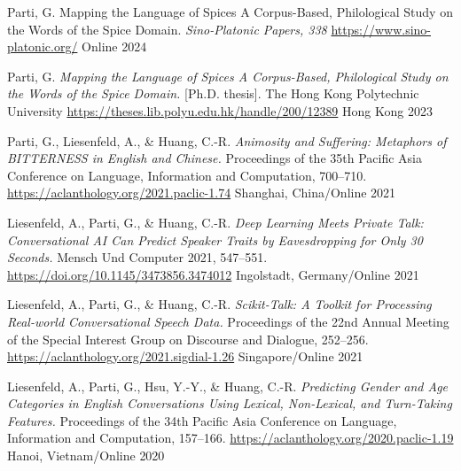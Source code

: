 
\begin{cvhonors}

  \cvhonor
  {Parti, G.} %
  {Mapping the Language of Spices A Corpus-Based, Philological Study on the Words of the Spice Domain. \textit{Sino-Platonic Papers, 338} \url{https://www.sino-platonic.org/}} %
  {Online} %
  {2024} %

  \cvhonor
  {Parti, G.} %
  {\textit{Mapping the Language of Spices A Corpus-Based, Philological Study on the Words of the Spice Domain.} [Ph.D. thesis]. The Hong Kong Polytechnic University \url{https://theses.lib.polyu.edu.hk/handle/200/12389}} %
  {Hong Kong} %
  {2023} %

  \cvhonor
    {Parti, G., Liesenfeld, A., \& Huang, C.-R.} %
    {\textit{Animosity and Suffering: Metaphors of BITTERNESS in English and Chinese.} Proceedings of the 35th Pacific Asia Conference on Language, Information and Computation, 700–710. \url{https://aclanthology.org/2021.paclic-1.74}} %
    {Shanghai, China/Online} %
    {2021} %

  \cvhonor
    {Liesenfeld, A., Parti, G., \& Huang, C.-R.} %
    {\textit{Deep Learning Meets Private Talk: Conversational AI Can Predict Speaker Traits by Eavesdropping for Only 30 Seconds.} Mensch Und Computer 2021, 547–551. \url{https://doi.org/10.1145/3473856.3474012}} %
    {Ingolstadt, Germany/Online} %
    {2021} %

  \cvhonor
    {Liesenfeld, A., Parti, G., \& Huang, C.-R.} %
    {\textit{Scikit-Talk: A Toolkit for Processing Real-world Conversational Speech Data.} Proceedings of the 22nd Annual Meeting of the Special Interest Group on Discourse and Dialogue, 252–256. \url{https://aclanthology.org/2021.sigdial-1.26}} %
    {Singapore/Online} %
    {2021} %

\cvhonor
    {Liesenfeld, A., Parti, G., Hsu, Y.-Y., \& Huang, C.-R.} %
    {\textit{Predicting Gender and Age Categories in English Conversations Using Lexical, Non-Lexical, and Turn-Taking Features.} Proceedings of the 34th Pacific Asia Conference on Language, Information and Computation, 157–166. \url{https://aclanthology.org/2020.paclic-1.19}} %
    {Hanoi, Vietnam/Online} %
    {2020} %


\end{cvhonors}
